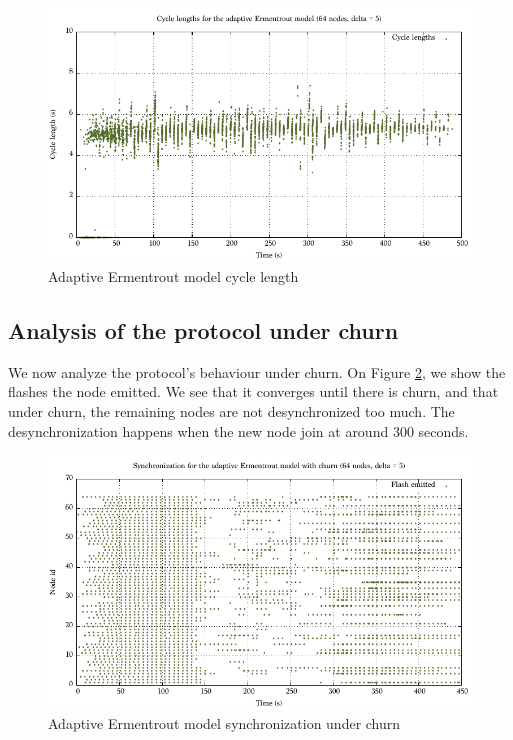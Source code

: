 \documentclass[a4paper, 11pt]{article}
\theoremstyle{plain}
\theoremstyle{definition}
\begin{document}
     \begin{figure}[h]
       \centering
       \includegraphics[width=\textwidth]{../Plots/Firefly-er-64nodes-d5-2-cl.pdf}
       \caption{Adaptive Ermentrout model cycle length}
       \label{fig:er-cl}
     \end{figure}


   \subsection{Analysis of the protocol under churn}
   \label{sec:analys-prot-under-churn}

     We now analyze the protocol's behaviour under churn. On Figure \ref{fig:er-churn-sync}, we show the
     flashes the node emitted. We see that it converges until there is churn, and that under churn, the
     remaining nodes are not desynchronized too much. The desynchronization happens when the new node join at
     around 300 seconds.

     \begin{figure}[h]
       \centering
       \includegraphics[width=\textwidth]{../Plots/Firefly-er-64nodes-churn-d5-10.pdf}
       \caption{Adaptive Ermentrout model synchronization under churn}
       \label{fig:er-churn-sync}
     \end{figure}
\end{document}
